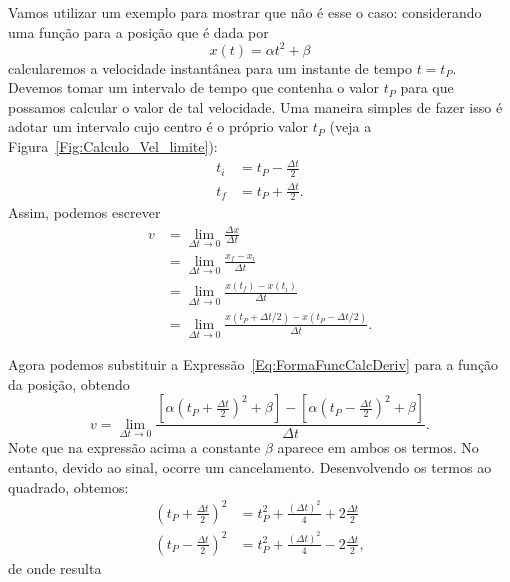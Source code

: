 Vamos utilizar um exemplo para mostrar que não é esse o caso: considerando uma função para a posição que é dada por
\begin{equation}\label{Eq:FormaFuncCalcDeriv}
    x(t) = \alpha t^2 + \beta
\end{equation}
%
calcularemos a velocidade instantânea para um instante de tempo $t = t_P$. Devemos tomar um intervalo de tempo que contenha o valor $t_P$ para que possamos calcular o valor de tal velocidade. Uma maneira simples de fazer isso é adotar um intervalo cujo centro é o próprio valor $t_P$ (veja a Figura~\ref{Fig:Calculo_Vel_limite}):
\begin{align}
    t_i &= t_P - \frac{\Delta t}{2} \\
    t_f &= t_P + \frac{\Delta t}{2}.
\end{align}
%
Assim, podemos escrever
\begin{align}
    v & = \lim_{\Delta t \to 0} \frac{\Delta x}{\Delta t} \\
    &= \lim_{\Delta t \to 0} \frac{x_f - x_i}{\Delta t} \\
    &= \lim_{\Delta t \to 0} \frac{x(t_f) - x(t_i)}{\Delta t} \\
    &= \lim_{\Delta t \to 0} \frac{x(t_P + \Delta t/2) - x(t_P-\Delta t / 2)}{\Delta t}.
\end{align}

Agora podemos substituir a Expressão~\eqref{Eq:FormaFuncCalcDeriv} para a função da posição, obtendo
\begin{equation}
    v = \lim_{\Delta t \to 0} \frac{\left[\alpha \left(t_P + \frac{\Delta t}{2}\right)^2 + \beta\right]-\left[\alpha \left(t_P - \frac{\Delta t}{2}\right)^2 + \beta\right]}{\Delta t}.
\end{equation}
%
Note que na expressão acima a constante $\beta$ aparece em ambos os termos. No entanto, devido ao sinal, ocorre um cancelamento. Desenvolvendo os termos ao quadrado, obtemos:
\begin{align}
    \left(t_P + \frac{\Delta t}{2}\right)^2 &= t_P^2 + \frac{(\Delta t)^2}{4} + 2\frac{\Delta t}{2} \\
    \left(t_P - \frac{\Delta t}{2}\right)^2 &= t_P^2 + \frac{(\Delta t)^2}{4} - 2\frac{\Delta t}{2},
\end{align}
%
de onde resulta


